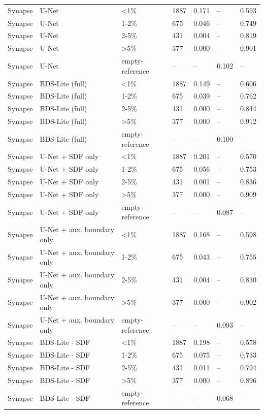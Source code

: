 \begin{tabular}{lllllll}
Synapse & U-Net & <1\% & 1887 & 0.171 & -- & 0.593 \\
Synapse & U-Net & 1-2\% & 675 & 0.046 & -- & 0.749 \\
Synapse & U-Net & 2-5\% & 431 & 0.004 & -- & 0.819 \\
Synapse & U-Net & >5\% & 377 & 0.000 & -- & 0.901 \\
Synapse & U-Net & empty-reference & -- & -- & 0.102 & -- \\
Synapse & BDS-Lite (full) & <1\% & 1887 & 0.149 & -- & 0.606 \\
Synapse & BDS-Lite (full) & 1-2\% & 675 & 0.039 & -- & 0.762 \\
Synapse & BDS-Lite (full) & 2-5\% & 431 & 0.000 & -- & 0.844 \\
Synapse & BDS-Lite (full) & >5\% & 377 & 0.000 & -- & 0.912 \\
Synapse & BDS-Lite (full) & empty-reference & -- & -- & 0.100 & -- \\
Synapse & U-Net + SDF only & <1\% & 1887 & 0.201 & -- & 0.570 \\
Synapse & U-Net + SDF only & 1-2\% & 675 & 0.056 & -- & 0.753 \\
Synapse & U-Net + SDF only & 2-5\% & 431 & 0.001 & -- & 0.836 \\
Synapse & U-Net + SDF only & >5\% & 377 & 0.000 & -- & 0.909 \\
Synapse & U-Net + SDF only & empty-reference & -- & -- & 0.087 & -- \\
Synapse & U-Net + aux. boundary only & <1\% & 1887 & 0.168 & -- & 0.598 \\
Synapse & U-Net + aux. boundary only & 1-2\% & 675 & 0.043 & -- & 0.755 \\
Synapse & U-Net + aux. boundary only & 2-5\% & 431 & 0.004 & -- & 0.830 \\
Synapse & U-Net + aux. boundary only & >5\% & 377 & 0.000 & -- & 0.902 \\
Synapse & U-Net + aux. boundary only & empty-reference & -- & -- & 0.093 & -- \\
Synapse & BDS-Lite - SDF & <1\% & 1887 & 0.198 & -- & 0.578 \\
Synapse & BDS-Lite - SDF & 1-2\% & 675 & 0.075 & -- & 0.733 \\
Synapse & BDS-Lite - SDF & 2-5\% & 431 & 0.011 & -- & 0.794 \\
Synapse & BDS-Lite - SDF & >5\% & 377 & 0.000 & -- & 0.896 \\
Synapse & BDS-Lite - SDF & empty-reference & -- & -- & 0.068 & -- \\

\end{tabular}
